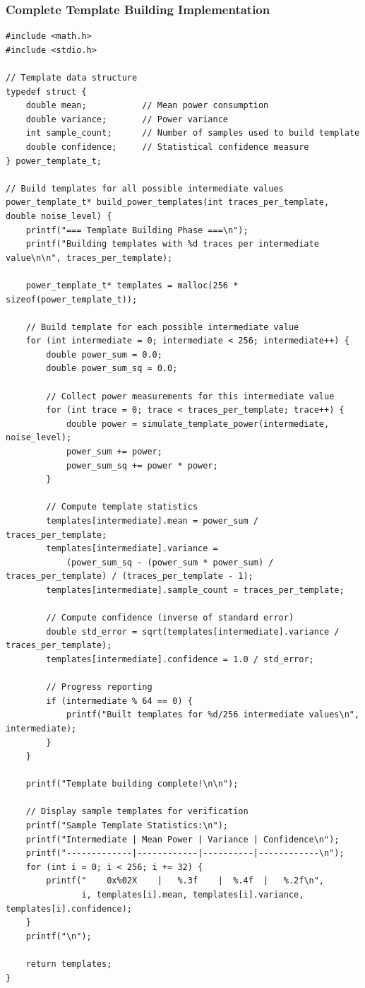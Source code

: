 \documentclass[11pt,a4paper]{article}
\theoremstyle{definition}
\begin{document}
\subsubsection{Complete Template Building Implementation}

\begin{lstlisting}[caption={Template Building Implementation}]
#include <math.h>
#include <stdio.h>

// Template data structure
typedef struct {
    double mean;           // Mean power consumption
    double variance;       // Power variance
    int sample_count;      // Number of samples used to build template
    double confidence;     // Statistical confidence measure
} power_template_t;

// Build templates for all possible intermediate values
power_template_t* build_power_templates(int traces_per_template, double noise_level) {
    printf("=== Template Building Phase ===\n");
    printf("Building templates with %d traces per intermediate value\n\n", traces_per_template);
    
    power_template_t* templates = malloc(256 * sizeof(power_template_t));
    
    // Build template for each possible intermediate value
    for (int intermediate = 0; intermediate < 256; intermediate++) {
        double power_sum = 0.0;
        double power_sum_sq = 0.0;
        
        // Collect power measurements for this intermediate value
        for (int trace = 0; trace < traces_per_template; trace++) {
            double power = simulate_template_power(intermediate, noise_level);
            power_sum += power;
            power_sum_sq += power * power;
        }
        
        // Compute template statistics
        templates[intermediate].mean = power_sum / traces_per_template;
        templates[intermediate].variance = 
            (power_sum_sq - (power_sum * power_sum) / traces_per_template) / (traces_per_template - 1);
        templates[intermediate].sample_count = traces_per_template;
        
        // Compute confidence (inverse of standard error)
        double std_error = sqrt(templates[intermediate].variance / traces_per_template);
        templates[intermediate].confidence = 1.0 / std_error;
        
        // Progress reporting
        if (intermediate % 64 == 0) {
            printf("Built templates for %d/256 intermediate values\n", intermediate);
        }
    }
    
    printf("Template building complete!\n\n");
    
    // Display sample templates for verification
    printf("Sample Template Statistics:\n");
    printf("Intermediate | Mean Power | Variance | Confidence\n");
    printf("-------------|------------|----------|------------\n");
    for (int i = 0; i < 256; i += 32) {
        printf("    0x%02X    |   %.3f    |  %.4f  |   %.2f\n", 
               i, templates[i].mean, templates[i].variance, templates[i].confidence);
    }
    printf("\n");
    
    return templates;
}
\end{lstlisting}
\end{document}
